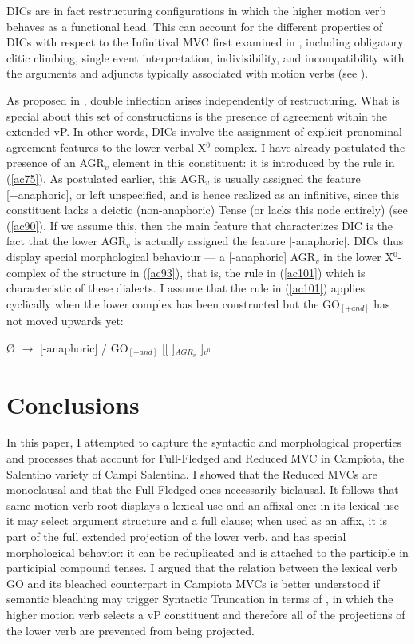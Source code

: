 \documentclass[output=paper]{langscibook}
\begin{document}
DICs are in fact restructuring configurations in which the higher motion verb behaves as a functional head. This can account for the different properties of DICs with respect to the Infinitival MVC first examined in \cite{cardinaletti2001a}, including obligatory clitic climbing, single event interpretation, indivisibility, and incompatibility with the arguments and adjuncts typically associated with motion verbs (see \cite{cardinaletti2001a, cardinaletti2003a, manzini2005a, cruschina2013a, caro2019a}). 

As proposed in \cite{cruschina2021a}, double inflection arises independently of restructuring. What is special about this set of constructions is the presence of agreement within the extended vP. In other words, DICs involve the assignment of explicit pronominal agreement features to the lower verbal X$^0$-complex. I have already postulated the presence of an  AGR$_v$ element in this constituent: it is introduced by the rule in (\ref{ac75}).  As postulated earlier, this AGR$_v$ is usually assigned the feature [+anaphoric], or left unspecified, and is hence realized as an infinitive, since this constituent lacks a deictic (non-anaphoric) Tense (or lacks this node entirely) (see (\ref{ac90}). If we assume this, then the main feature that characterizes DIC is the fact that the lower AGR$_v$ is actually assigned the feature [-anaphoric]. DICs thus display special morphological behaviour — a [-anaphoric] AGR$_v$ in the lower X$^0$-complex of the structure in (\ref{ac93}), that is, the rule in (\ref{ac101}) which is characteristic of these dialects. I assume that the rule in (\ref{ac101}) applies cyclically when the lower complex has been constructed but the GO$_{[+and]}$ has not moved upwards yet:
 
\ea \label{ac101}Ø $\rightarrow$ [-anaphoric] /  GO$_{[+and]}$ [[ \underline{\hspace{3em}} ]$_{ AGR_v}$ ]$_{v^0}$
\z

\section{Conclusions} 
 
In this paper, I attempted to capture the syntactic and morphological properties and processes that account for Full-Fledged and Reduced MVC in Campiota, the Salentino variety of Campi Salentina. I showed that the Reduced MVCs are monoclausal and that the Full-Fledged ones necessarily biclausal. It follows that same motion verb root displays a lexical use and an affixal one:  in its lexical use it may select argument structure and a full clause; when used as an affix, it is part of the full extended projection of the lower verb, and has special morphological behavior: it can be reduplicated and is attached to the participle in participial compound tenses. I argued that the relation between the lexical verb GO and its bleached counterpart in Campiota MVCs is better understood if semantic bleaching may trigger Syntactic Truncation  in terms of \citealt{wurmbrand2014a, wurmbrand2015, wurmbrand2017verb}, in which the higher motion verb selects a vP constituent and therefore all of the projections of the lower verb are prevented from being projected. 
 
\end{document}
